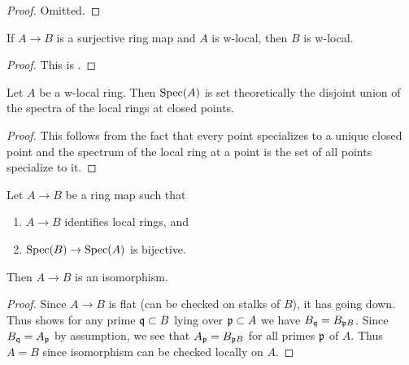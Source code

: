 \begin{proof}
  Omitted.
\end{proof}

\begin{lemma}
  \label{thm:surjective-w-local-ring}
  If \(A \to B\) is a surjective ring map and \(A\) is w-local, then \(B\) is w-local.
  \leanok
\end{lemma}

\begin{proof}
  This is .
\end{proof}

\begin{lemma}
  \label{thm:w-local-set-decomposition}
  Let $A$ be a w-local ring. Then $\operatorname{Spec} (A)$ is set theoretically the disjoint union of the spectra of the local
  rings at closed points.
\end{lemma}

\begin{proof}
  This follows from the fact that every point specializes to a unique closed point and the spectrum of the local ring at a point is the set of all points specialize to it.
\end{proof}

\begin{lemma}
  \label{thm:isom-of-identifies-local-rings-bijective}
  \leanok
  Let $A \to B$ be a ring map such that
  \begin{enumerate}
    \item $A \to B$ identifies local rings, and
    \item $\operatorname{Spec} (B) \to \operatorname{Spec} (A)$ is bijective.
  \end{enumerate}
  Then $A \to B$ is an isomorphism.
\end{lemma}

\begin{proof}
    Since $A \to B$ is flat (can be checked on stalks of \(B\)), it has going down. %
    Thus  shows for any prime ${\mathfrak{q}} \subset B$ lying over ${\mathfrak{p}} \subset A$ we have $B_{{\mathfrak{q}}} = B_{{\mathfrak{p}} B}$. Since $B_{{\mathfrak{q}}} = A_{{\mathfrak{p}}}$ by assumption, we see that $A_{{\mathfrak{p}}} = B_{{\mathfrak{p}} B}$ for all primes ${\mathfrak{p}}$ of $A$. Thus $A = B$ since isomorphism can be checked locally on $A$.
\end{proof}


